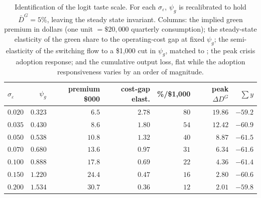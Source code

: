 \begin{table}[H]
\centering\small
\begin{tabular}{lrrrrrr}
\toprule
$\sigma_\varepsilon$ & $\psi_g$ & premium \$000 & cost-gap elast. & \%/\$1{,}000 & peak $\Delta D^G$ & $\sum y$ \\
\midrule
$0.020$ & $0.323$ & $6.5$ & $2.78$ & $80$ & $19.86$ & $-59.2$ \\
$0.035$ & $0.430$ & $8.6$ & $1.80$ & $54$ & $12.42$ & $-60.9$ \\
$0.050$ & $0.538$ & $10.8$ & $1.32$ & $40$ & $8.87$ & $-61.5$ \\
$0.070$ & $0.680$ & $13.6$ & $0.97$ & $31$ & $6.34$ & $-61.6$ \\
$0.100$ & $0.888$ & $17.8$ & $0.69$ & $22$ & $4.36$ & $-61.4$ \\
$0.150$ & $1.220$ & $24.4$ & $0.47$ & $16$ & $2.80$ & $-60.6$ \\
$0.200$ & $1.534$ & $30.7$ & $0.36$ & $12$ & $2.01$ & $-59.8$ \\
\bottomrule
\end{tabular}
\caption{Identification of the logit taste scale. For each $\sigma_\varepsilon$,
$\psi_g$ is recalibrated to hold $\bar D^G=5\%$, leaving the steady state invariant.
Columns: the implied green premium in dollars (one unit $=\$20{,}000$ quarterly
consumption); the steady-state elasticity of the green share to the operating-cost
gap at fixed $\psi_g$; the semi-elasticity of the switching flow to a \$1{,}000 cut
in $\psi_g$, matched to \citet{GallagherMuehlegger2011,Chandra2010,MuehleggerRapson2022}; the peak
crisis adoption response; and the cumulative output loss, flat while the adoption
responsiveness varies by an order of magnitude.}
\label{tab:taste_identification}
\end{table}
